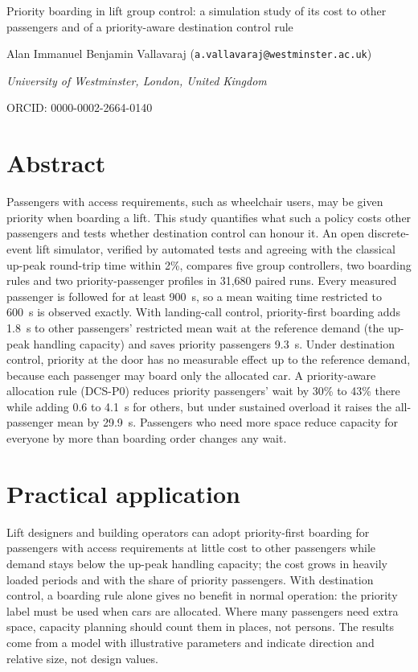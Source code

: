 \documentclass[12pt,a4paper]{article}
\begin{document}
\begin{center}
{\LARGE Priority boarding in lift group control: a simulation study of its cost to other passengers and of a priority-aware destination control rule\par}
\vspace{1.2em}
{\large Alan Immanuel Benjamin Vallavaraj (\texttt{a.vallavaraj@westminster.ac.uk})\par}
\vspace{.4em}
{\itshape University of Westminster, London, United Kingdom\par}
\vspace{.4em}
{\small ORCID: 0000-0002-2664-0140\par}
\end{center}

\section*{Abstract}
Passengers with access requirements, such as wheelchair users, may be given priority when boarding a lift. This study quantifies what such a policy costs other passengers and tests whether destination control can honour it. An open discrete-event lift simulator, verified by automated tests and agreeing with the classical up-peak round-trip time within 2\%, compares five group controllers, two boarding rules and two priority-passenger profiles in 31,680 paired runs. Every measured passenger is followed for at least 900~s, so a mean waiting time restricted to 600~s is observed exactly. With landing-call control, priority-first boarding adds 1.8~s to other passengers' restricted mean wait at the reference demand (the up-peak handling capacity) and saves priority passengers 9.3~s. Under destination control, priority at the door has no measurable effect up to the reference demand, because each passenger may board only the allocated car. A priority-aware allocation rule (DCS-P0) reduces priority passengers' wait by 30\% to 43\% there while adding 0.6 to 4.1~s for others, but under sustained overload it raises the all-passenger mean by 29.9~s. Passengers who need more space reduce capacity for everyone by more than boarding order changes any wait.

\section*{Practical application}
Lift designers and building operators can adopt priority-first boarding for passengers with access requirements at little cost to other passengers while demand stays below the up-peak handling capacity; the cost grows in heavily loaded periods and with the share of priority passengers. With destination control, a boarding rule alone gives no benefit in normal operation: the priority label must be used when cars are allocated. Where many passengers need extra space, capacity planning should count them in places, not persons. The results come from a model with illustrative parameters and indicate direction and relative size, not design values.
\end{document}
